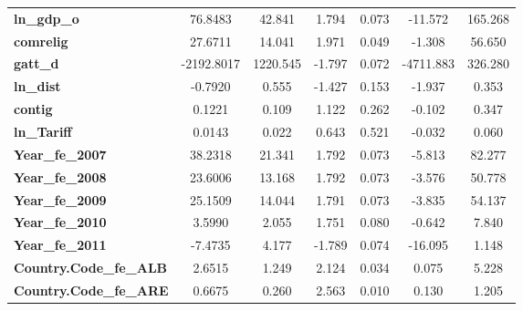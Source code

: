 \begin{center}
\begin{tabular}{lcccccc}
\textbf{ln\_gdp\_o}                                       &      76.8483  &       42.841     &     1.794  &         0.073        &      -11.572    &      165.268     \\
\textbf{comrelig}                                         &      27.6711  &       14.041     &     1.971  &         0.049        &       -1.308    &       56.650     \\
\textbf{gatt\_d}                                          &   -2192.8017  &     1220.545     &    -1.797  &         0.072        &    -4711.883    &      326.280     \\
\textbf{ln\_dist}                                         &      -0.7920  &        0.555     &    -1.427  &         0.153        &       -1.937    &        0.353     \\
\textbf{contig}                                           &       0.1221  &        0.109     &     1.122  &         0.262        &       -0.102    &        0.347     \\
\textbf{ln\_Tariff}                                       &       0.0143  &        0.022     &     0.643  &         0.521        &       -0.032    &        0.060     \\
\textbf{Year\_fe\_2007}                                   &      38.2318  &       21.341     &     1.792  &         0.073        &       -5.813    &       82.277     \\
\textbf{Year\_fe\_2008}                                   &      23.6006  &       13.168     &     1.792  &         0.073        &       -3.576    &       50.778     \\
\textbf{Year\_fe\_2009}                                   &      25.1509  &       14.044     &     1.791  &         0.073        &       -3.835    &       54.137     \\
\textbf{Year\_fe\_2010}                                   &       3.5990  &        2.055     &     1.751  &         0.080        &       -0.642    &        7.840     \\
\textbf{Year\_fe\_2011}                                   &      -7.4735  &        4.177     &    -1.789  &         0.074        &      -16.095    &        1.148     \\
\textbf{Country.Code\_fe\_ALB}                            &       2.6515  &        1.249     &     2.124  &         0.034        &        0.075    &        5.228     \\
\textbf{Country.Code\_fe\_ARE}                            &       0.6675  &        0.260     &     2.563  &         0.010        &        0.130    &        1.205     \\

\end{tabular}
\end{center}
